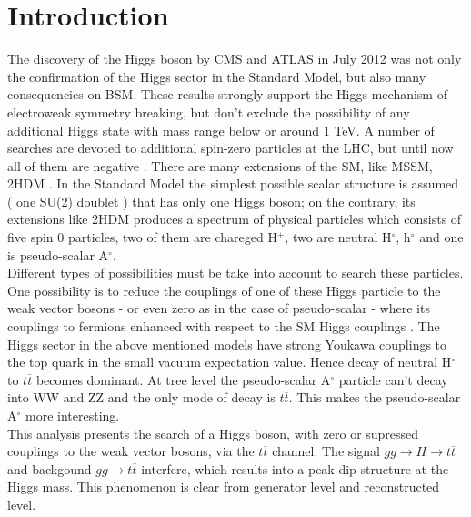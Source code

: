 \documentclass{cmspaper}
\begin{document}
\section{Introduction}
The discovery of the Higgs boson by CMS \cite{HiggsCMS} and ATLAS \cite{HiggsATLAS} in July 2012 was not only the confirmation of the Higgs sector in the Standard Model, but also many consequencies on BSM. These results strongly support the Higgs mechanism of electroweak symmetry breaking, but don't exclude the possibility of any additional Higgs state with mass range below or around 1 TeV. A number of searches are devoted to additional spin-zero particles at the LHC, but until now all of them are negative \cite{5584}. There are many extensions of the SM, like MSSM, 2HDM \cite{2HDM}. In the Standard Model the simplest possible scalar structure is assumed ( one SU(2) doublet ) that has only one Higgs boson; on the contrary, its extensions like 2HDM produces a spectrum of physical particles which consists of five spin 0 particles, two of them are chareged H$^\pm$, two are neutral H$^\circ$, h$^\circ$ and one is pseudo-scalar A$^\circ$. \\
Different types of possibilities must be take into account to search these particles. One possibility is to reduce the couplings of one of these Higgs particle to the weak vector bosons - or even zero as in the case of pseudo-scalar - where its couplings to fermions enhanced with respect to the SM Higgs couplings \cite{SignHiggs}. The Higgs sector in the above mentioned models have strong Youkawa couplings to the top quark in the small vacuum expectation value. Hence decay of neutral H$^\circ$ to $t\overline{t}$ becomes dominant. At tree level the pseudo-scalar A$^\circ$ particle can't decay into WW and ZZ and the only mode of decay is $t\overline{t}$. This makes the pseudo-scalar A$^\circ$ more interesting.\\
This analysis presents the search of a Higgs boson, with zero or supressed couplings to the weak vector bosons, via the $t\overline{t}$ channel. The signal $gg\rightarrow H\rightarrow t\overline{t}$ and backgound $gg\rightarrow t\overline{t}$ interfere, which results into a peak-dip structure at the Higgs mass. This phenomenon is clear from generator level and reconstructed level.\\
\end{document}
